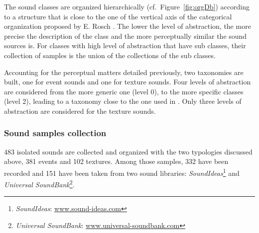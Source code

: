 \documentclass[preprint,12pt]{elsarticle}
\newcommand{\cf}{cf.}
\begin{document}
The sound classes are organized hierarchically (\cf~Figure~\ref{fig:orgDb}) according to a structure that is close to the one of the vertical axis of the categorical organization proposed by E. Rosch \cite{rosch1978cognition}. The lower the level of abstraction, the more precise the description of the class and the more perceptually similar the sound sources is. For classes with high level of abstraction that have sub classes, their collection of samples is the union of the collections of the sub classes.


Accounting for the perceptual matters detailed previously, two taxonomies are built, one for event sounds and one for texture sounds. Four levels of abstraction are considered from the more generic one (level 0), to the more specific classes (level 2), leading to a taxonomy close to the one used in \cite{Salamon14}. Only three levels of abstraction are considered for the texture sounds.

\subsubsection*{Sound samples collection}


483 isolated sounds are collected and organized with the two typologies discussed above, 381 events and 102 textures. Among those samples, 332 have been recorded and 151 have been taken from two sound libraries: \emph{SoundIdeas}\footnote{\emph{SoundIdeas}: \url{www.sound-ideas.com}} and \emph{Universal SoundBank}\footnote{\emph{Universal SoundBank}: \url{www.universal-soundbank.com}}.
\end{document}
